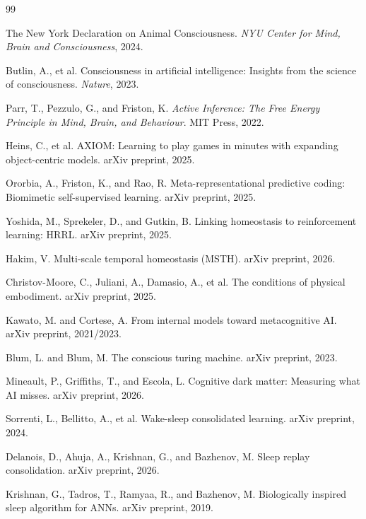 \documentclass[11pt,a4paper]{article}
\begin{document}
\begin{thebibliography}{99}

The New York Declaration on Animal Consciousness.
\textit{NYU Center for Mind, Brain and Consciousness}, 2024.

Butlin, A., et al.
Consciousness in artificial intelligence: Insights from the science of consciousness.
\textit{Nature}, 2023.

Parr, T., Pezzulo, G., and Friston, K.
\textit{Active Inference: The Free Energy Principle in Mind, Brain, and Behaviour}.
MIT Press, 2022.

Heins, C., et al.
AXIOM: Learning to play games in minutes with expanding object-centric models.
arXiv preprint, 2025.

Ororbia, A., Friston, K., and Rao, R.
Meta-representational predictive coding: Biomimetic self-supervised learning.
arXiv preprint, 2025.

Yoshida, M., Sprekeler, D., and Gutkin, B.
Linking homeostasis to reinforcement learning: HRRL.
arXiv preprint, 2025.

Hakim, V.
Multi-scale temporal homeostasis (MSTH).
arXiv preprint, 2026.

Christov-Moore, C., Juliani, A., Damasio, A., et al.
The conditions of physical embodiment.
arXiv preprint, 2025.

Kawato, M. and Cortese, A.
From internal models toward metacognitive AI.
arXiv preprint, 2021/2023.

Blum, L. and Blum, M.
The conscious turing machine.
arXiv preprint, 2023.

Mineault, P., Griffiths, T., and Escola, L.
Cognitive dark matter: Measuring what AI misses.
arXiv preprint, 2026.

Sorrenti, L., Bellitto, A., et al.
Wake-sleep consolidated learning.
arXiv preprint, 2024.

Delanois, D., Ahuja, A., Krishnan, G., and Bazhenov, M.
Sleep replay consolidation.
arXiv preprint, 2026.

Krishnan, G., Tadros, T., Ramyaa, R., and Bazhenov, M.
Biologically inspired sleep algorithm for ANNs.
arXiv preprint, 2019.


\end{thebibliography}
\end{document}
